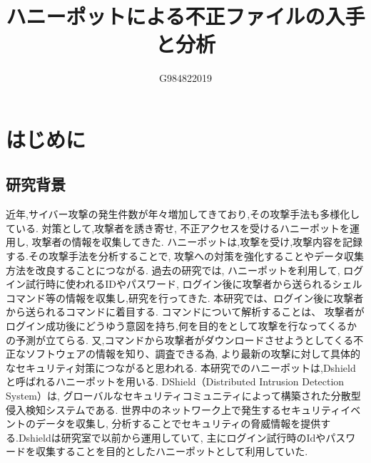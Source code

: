 \documentclass{entry}
\title{ハニーポットによる不正ファイルの入手と分析}
\author{G984822019}{吉村　直将}
\begin{document}
\maketitle

\section{はじめに}
\subsection{研究背景}

近年,サイバー攻撃の発生件数が年々増加してきており,その攻撃手法も多様化している.
対策として,攻撃者を誘き寄せ,
不正アクセスを受けるハニーポットを運用し,
攻撃者の情報を収集してきた.
ハニーポットは,攻撃を受け,攻撃内容を記録する.その攻撃手法を分析することで,
攻撃への対策を強化することやデータ収集方法を改良することにつながる.
過去の研究では,
ハニーポットを利用して,
ログイン試行時に使われるIDやパスワード,
ログイン後に攻撃者から送られるシェルコマンド等の情報を収集し,研究を行ってきた.\cite{Entry}
本研究では、ログイン後に攻撃者から送られるコマンドに着目する.
コマンドについて解析することは、
攻撃者がログイン成功後にどうゆう意図を持ち,何を目的をとして攻撃を行なってくるかの予測が立てらる.
又,コマンドから攻撃者がダウンロードさせようとしてくる不正なソフトウェアの情報を知り、調査できる為,
より最新の攻撃に対して具体的なセキュリティ対策につながると思われる.
本研究でのハニーポットは,Dshieldと呼ばれるハニーポットを用いる.
DShield（Distributed Intrusion Detection System）は,
グローバルなセキュリティコミュニティによって構築された分散型侵入検知システムである.
世界中のネットワーク上で発生するセキュリティイベントのデータを収集し,
分析することでセキュリティの脅威情報を提供する.Dshieldは研究室で以前から運用していて,
主にログイン試行時のIdやパスワードを収集することを目的としたハニーポットとして利用していた.
\end{document}
